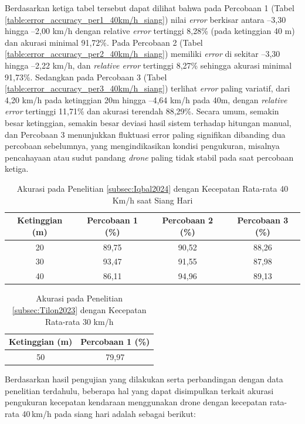 Berdasarkan ketiga tabel tersebut dapat dilihat bahwa pada Percobaan 1 (Tabel \ref{table:error_accuracy_per1_40km/h_siang}) nilai \emph{error} berkisar antara –3,30 hingga –2,00 km/h dengan relative \emph{error} tertinggi 8,28\% (pada ketinggian 40 m) dan akurasi minimal 91,72\%. Pada Percobaan 2 (Tabel \ref{table:error_accuracy_per2_40km/h_siang}) memiliki \emph{error} di sekitar –3,30 hingga –2,22 km/h, dan \emph{relative error} tertinggi 8,27\% sehingga akurasi minimal 91,73\%. Sedangkan pada Percobaan 3 (Tabel \ref{table:error_accuracy_per3_40km/h_siang}) terlihat \emph{error} paling variatif, dari 4,20 km/h pada ketinggian 20m hingga –4,64 km/h pada 40m, dengan \emph{relative error} tertinggi 11,71\% dan akurasi terendah 88,29\%. Secara umum, semakin besar ketinggian, semakin besar deviasi hasil sistem terhadap hitungan manual, dan Percobaan 3 menunjukkan fluktuasi error paling signifikan dibanding dua percobaan sebelumnya, yang mengindikasikan kondisi pengukuran, misalnya pencahayaan atau sudut pandang \emph{drone} paling tidak stabil pada saat percobaan ketiga.

\begin{table}[H]
\centering
	\caption{Akurasi pada Penelitian \ref{subsec:Iqbal2024} dengan Kecepatan Rata-rata 40 Km/h saat Siang Hari}
	\label{table:accuracy_40km/h_iqbal}
	\begin{tabular}{|c|c|c|c|}
	\hline
	\textbf{Ketinggian (m)} & \textbf{Percobaan 1 (\%)} & \textbf{Percobaan 2 (\%)} & \textbf{Percobaan 3 (\%)} \\
	\hline
	20 & 89,75 & 90,52 & 88,26 \\
	30 & 93,47 & 91,55 & 87,98 \\
	40 & 86,11 & 94,96 & 89,13 \\
	\hline
	\end{tabular}
\end{table}
\vspace{-10pt}
\begin{table}[H]
\centering
\caption{Akurasi pada Penelitian \ref{subsec:Tilon2023} dengan Kecepatan Rata-rata 30 km/h}
\label{table:accuracy_tilon_30km/h}
\begin{tabular}{|c|c|}
\hline
\textbf{Ketinggian (m)} & \textbf{Percobaan 1 (\%)} \\ \hline
50 & 79,97 \\ \hline
\end{tabular}
\end{table}

Berdasarkan hasil pengujian yang dilakukan serta perbandingan dengan data penelitian terdahulu, beberapa hal yang dapat disimpulkan terkait akurasi pengukuran kecepatan kendaraan menggunakan drone dengan kecepatan rata-rata 40\,km/h pada siang hari adalah sebagai berikut:

